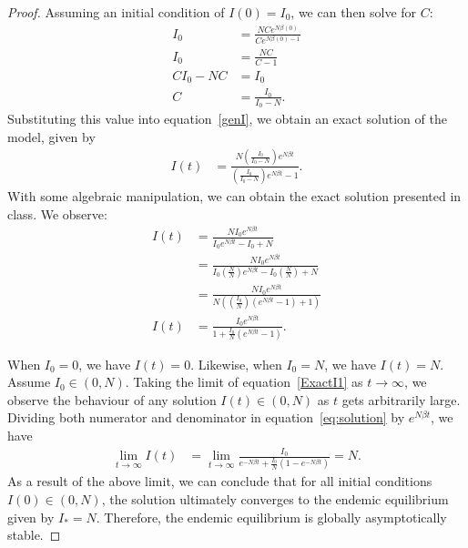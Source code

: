 \documentclass[12pt]{article}
\begin{document}
\begin{enumerate}[(a)]
\begin{enumerate}[(i)]
{\begin{proof}
Assuming an initial condition of $I(0) = I_0$, we can then solve for $C$:
\begin{equation*}
\begin{aligned}
I_0 &= \frac{NCe^{N\beta(0)}}{Ce^{N\beta(0)-1}} \\
I_0 &= \frac{NC}{C-1} \\
C I_0 - NC &= I_0 \\
C &= \frac{I_0}{I_0 - N}.
\end{aligned}
\end{equation*}
Substituting this value into equation~\eqref{genI}, we obtain an exact solution of the model, given by
\begin{equation}
\begin{aligned}
I(t) &= \frac{N \left(\frac{I_0}{I_0 - N}\right) e^{N \beta t}}{\left(\frac{I_0}{I_0 - N}\right) e^{N \beta t} - 1}.
\label{ExactI1}
\end{aligned}
\end{equation}
With some algebraic manipulation, we can obtain the exact solution presented in class. We observe:
\begin{equation} \label{eq:solution}
\begin{aligned}
I(t) &= \frac{N I_0 e^{N \beta t}}{I_0 e^{N \beta t} - I_0 + N} \\
&= \frac{N I_0 e^{N \beta t}}{I_0 \left(\frac{N}{N}\right) e^{N \beta t} - I_0 \left(\frac{N}{N}\right) + N} \\
&= \frac{N I_0 e^{N \beta t}}{N\left(\left(\frac{I_0}{N}\right)(e^{N\beta t} - 1) + 1\right)} \\
I(t) &= \frac{I_0 e^{N \beta t}}{1 + \frac{I_0}{N}(e^{N \beta t} - 1)}.
\end{aligned}
\end{equation}

When $I_0 = 0$, we have $I(t) = 0$. Likewise, when $I_0 = N$, we have $I(t) = N$. Assume $I_0 \in (0, N)$.
Taking the limit of equation~\eqref{ExactI1} as $t \to \infty$, we observe the behaviour of any solution $I(t) \in (0,N)$ as $t$ gets arbitrarily large. Dividing both numerator and denominator in equation~\eqref{eq:solution} by $e^{N \beta t}$, we have
\begin{equation*}
\begin{aligned}
\lim_{t \to \infty} I(t) &= \lim_{t \to \infty}  \frac{I_0}{ e^{-N \beta t} + \frac{I_0}{N}(1 -  e^{-N \beta t})} = N.
\end{aligned}
\end{equation*}
As a result of the above limit, we can conclude that for all initial conditions $I(0) \in (0,N)$, the solution ultimately converges to the endemic equilibrium given by $I_\ast = N$.
Therefore, the endemic equilibrium is globally asymptotically stable.
      \end{proof}
    }
    

\end{enumerate}
\end{enumerate}
\end{document}
